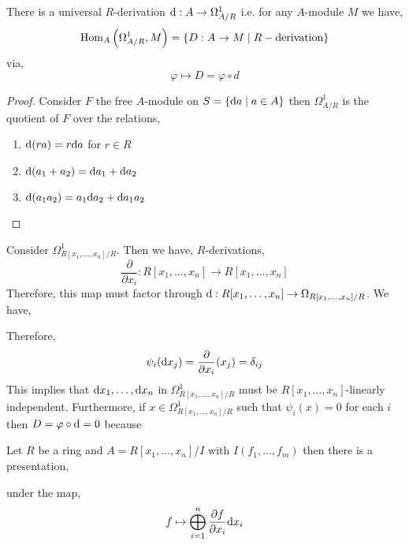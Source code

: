 \documentclass[12pt]{article}
\begin{document}
\begin{lemma}
There is a universal $R$-derivation $\mathrm{d}{} : A \to \Omega^1_{A/R}$ i.e. for any $A$-module $M$ we have,
\[ \text{Hom}_{A}\left( \Omega_{A/R}^1, M \right) = \{ D : A \to M \mid R-\text{derivation} \} \]
via,
\[ \varphi \mapsto D = \varphi \circ d \]
\end{lemma}

\begin{proof}
Consider $F$ the free $A$-module on $S = \{ \mathrm{d}{a} \mid a \in A \}$ then $\Omega_{A/R}^1$ is the quotient of $F$ over the relations,
\begin{enumerate}
\item $\mathrm{d}{(ra)} = r \mathrm{d}{a}$ for $r \in R$
\item $\mathrm{d}{(a_1 + a_2)} = \mathrm{d}{a_1} + \mathrm{d}{a_2}$
\item $\mathrm{d}{(a_1 a_2)} = a_1 \mathrm{d}{a_2} + \mathrm{d}{a_1} a_2$
\end{enumerate}
\end{proof}

\begin{example}
Consider $\Omega^1_{R[x_1, \dots, x_n] / R}$. Then we have, $R$-derivations,
\[ \frac{\partial}{\partial x_i} : R[x_1, \dots, x_n] \to R[x_1, \dots, x_n] \]
Therefore, this map must factor through $\mathrm{d}{} : R[x_1, \dots, x_n] \to \Omega_{R[x_1, \dots, x_n] / R}$. We have,
\begin{center}
\end{center}
Therefore, 
\[ \psi_i(\mathrm{d}{x_j}) = \frac{\partial}{\partial x_i} (x_j) = \delta_{ij} \]
This implies that $\mathrm{d}{x_1}, \dots, \mathrm{d}{x_n}$ in $\Omega^1_{R[x_1, \dots, x_n] / R}$ must be $R[x_1, \dots, x_n]$-linearly independent. Furthermore, if $x \in \Omega^1_{R[x_1, \dots, x_n] / R}$ such that $\psi_i(x) = 0$ for each $i$ then $D = \varphi \circ \mathrm{d}{} = 0$ because 
\end{example}

\begin{lemma}
Let $R$ be a ring and $A = R[x_1, \dots, x_n] / I$ with $I  (f_1, \dots, f_m)$ then there is a presentation,
\begin{center}
\end{center} 
under the map,
\[ f \mapsto \bigoplus_{i = 1}^n \frac{\partial f}{\partial x_i} \mathrm{d}{x_i} \] 
\end{lemma}
\end{document}
